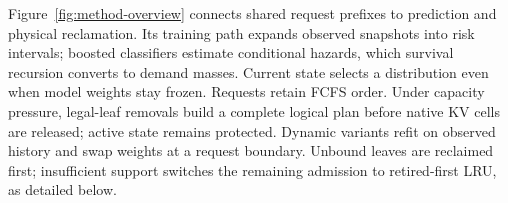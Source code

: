 Figure~\ref{fig:method-overview} connects shared request prefixes to
prediction and physical reclamation. Its training path expands observed
snapshots into risk intervals; boosted classifiers estimate conditional
hazards, which survival recursion converts to demand masses. Current
state selects a distribution even when model weights stay frozen.
Requests retain FCFS order. Under capacity pressure, legal-leaf removals
build a complete logical plan before native KV cells are released;
active state remains protected. Dynamic variants refit on observed
history and swap weights at a request boundary. Unbound leaves are
reclaimed first; insufficient support switches the remaining admission
to retired-first LRU, as detailed below.
